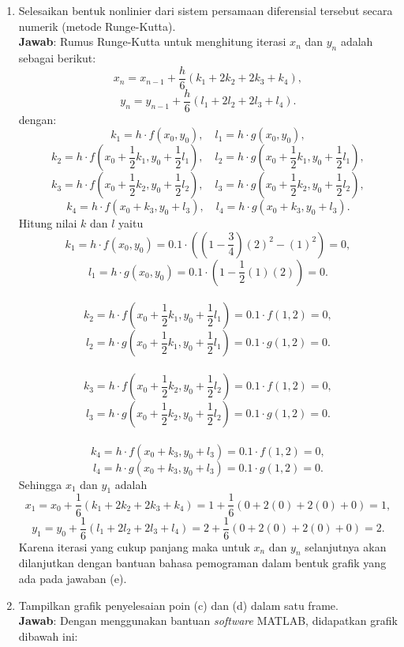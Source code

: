 \documentclass{article}
\begin{document}
\begin{enumerate}[label=\alph*.]
    \item Selesaikan bentuk nonlinier dari sistem persamaan diferensial tersebut secara numerik (metode Runge-Kutta). \\
    \textbf{Jawab}: Rumus Runge-Kutta untuk menghitung iterasi $x_n$ dan $y_n$ adalah sebagai berikut:
    \[
    x_n = x_{n-1} + \frac{h}{6}(k_1 + 2k_2 + 2k_3 + k_4),
    \]
    \[
    y_n = y_{n-1} + \frac{h}{6}(l_1 + 2l_2 + 2l_3 + l_4).
    \]
    dengan:
    \[
    k_1 = h \cdot f(x_0, y_0), \quad l_1 = h \cdot g(x_0, y_0),
    \]
    \[
    k_2 = h \cdot f\left(x_0 + \frac{1}{2}k_1, y_0 + \frac{1}{2}l_1\right), \quad l_2 = h \cdot g\left(x_0 + \frac{1}{2}k_1, y_0 + \frac{1}{2}l_1\right),
    \]
    \[
    k_3 = h \cdot f\left(x_0 + \frac{1}{2}k_2, y_0 + \frac{1}{2}l_2\right), \quad l_3 = h \cdot g\left(x_0 + \frac{1}{2}k_2, y_0 + \frac{1}{2}l_2\right),
    \]
    \[
    k_4 = h \cdot f(x_0 + k_3, y_0 + l_3), \quad l_4 = h \cdot g(x_0 + k_3, y_0 + l_3).
    \]
    Hitung nilai $k$ dan $l$ yaitu
    \[
    k_1 = h \cdot f(x_0, y_0) = 0.1 \cdot \left(\left(1 - \frac{3}{4}\right)(2)^2 - (1)^2\right) = 0,
    \]
    \[
    l_1 = h \cdot g(x_0, y_0) = 0.1 \cdot \left(1 - \frac{1}{2}(1)(2)\right) = 0.
    \] \\
    \[
    k_2 = h \cdot f\left(x_0 + \frac{1}{2}k_1, y_0 + \frac{1}{2}l_1\right) = 0.1 \cdot f(1, 2) = 0,
    \]
    \[
    l_2 = h \cdot g\left(x_0 + \frac{1}{2}k_1, y_0 + \frac{1}{2}l_1\right) = 0.1 \cdot g(1, 2) = 0.
    \] \\
    \[
    k_3 = h \cdot f\left(x_0 + \frac{1}{2}k_2, y_0 + \frac{1}{2}l_2\right) = 0.1 \cdot f(1, 2) = 0,
    \]
    \[
    l_3 = h \cdot g\left(x_0 + \frac{1}{2}k_2, y_0 + \frac{1}{2}l_2\right) = 0.1 \cdot g(1, 2) = 0.
    \] \\
    \[
    k_4 = h \cdot f(x_0 + k_3, y_0 + l_3) = 0.1 \cdot f(1, 2) = 0,
    \]
    \[
    l_4 = h \cdot g(x_0 + k_3, y_0 + l_3) = 0.1 \cdot g(1, 2) = 0.
    \]
    Sehingga $x_1$ dan $y_1$ adalah 
    \[
    x_1 = x_0 + \frac{1}{6}(k_1 + 2k_2 + 2k_3 + k_4) = 1 + \frac{1}{6}(0 + 2(0) + 2(0) + 0) = 1,
    \]
    \[
    y_1 = y_0 + \frac{1}{6}(l_1 + 2l_2 + 2l_3 + l_4) = 2 + \frac{1}{6}(0 + 2(0) + 2(0) + 0) = 2.
    \]
    Karena iterasi yang cukup panjang maka untuk $x_n$ dan $y_n$ selanjutnya akan dilanjutkan dengan bantuan bahasa pemograman dalam bentuk grafik yang ada pada jawaban (e).
    
    \item Tampilkan grafik penyelesaian poin (c) dan (d) dalam satu frame. \\
    \textbf{Jawab}: Dengan menggunakan bantuan \textit{software} MATLAB, didapatkan grafik dibawah ini:
    

\end{enumerate}
\end{document}
